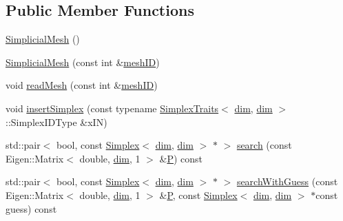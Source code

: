 \subsection*{Public Member Functions}
\begin{DoxyCompactItemize}
\item 
\hyperlink{classmodel_1_1_simplicial_mesh_af84ab44ecf01c06410af0e7f3197f55d}{Simplicial\+Mesh} ()
\item 
\hyperlink{classmodel_1_1_simplicial_mesh_ad6e3f7fa2244f9225ab9c1f3e2dbeea8}{Simplicial\+Mesh} (const int \&\hyperlink{_f_e_m_2linear__elasticity__3d_2tetgen_2generate_p_o_l_ycube_8m_a08458a039e09e0161694c4dc402b9732}{mesh\+I\+D})
\item 
void \hyperlink{classmodel_1_1_simplicial_mesh_a3aa461ba7e48b0f6f2712b7d3080468d}{read\+Mesh} (const int \&\hyperlink{_f_e_m_2linear__elasticity__3d_2tetgen_2generate_p_o_l_ycube_8m_a08458a039e09e0161694c4dc402b9732}{mesh\+I\+D})
\item 
void \hyperlink{classmodel_1_1_simplicial_mesh_a009ee6831738dcd9deacb996c4c68c96}{insert\+Simplex} (const typename \hyperlink{structmodel_1_1_simplex_traits}{Simplex\+Traits}$<$ \hyperlink{classmodel_1_1_simplicial_mesh_ad468b9bb3c67ec696a104445990d356ea29115db50a11d5e61cc38bf2db030e66}{dim}, \hyperlink{classmodel_1_1_simplicial_mesh_ad468b9bb3c67ec696a104445990d356ea29115db50a11d5e61cc38bf2db030e66}{dim} $>$\+::Simplex\+I\+D\+Type \&x\+I\+N)
\item 
std\+::pair$<$ bool, const \hyperlink{classmodel_1_1_simplex}{Simplex}$<$ \hyperlink{classmodel_1_1_simplicial_mesh_ad468b9bb3c67ec696a104445990d356ea29115db50a11d5e61cc38bf2db030e66}{dim}, \hyperlink{classmodel_1_1_simplicial_mesh_ad468b9bb3c67ec696a104445990d356ea29115db50a11d5e61cc38bf2db030e66}{dim} $>$ $\ast$ $>$ \hyperlink{classmodel_1_1_simplicial_mesh_a86c678632fb205d1da7960c2cb5bc1e5}{search} (const Eigen\+::\+Matrix$<$ double, \hyperlink{classmodel_1_1_simplicial_mesh_ad468b9bb3c67ec696a104445990d356ea29115db50a11d5e61cc38bf2db030e66}{dim}, 1 $>$ \&\hyperlink{_f_e_m_2linear__elasticity__3d_2tetgen_2generate_p_o_l_ycube_8m_a50a9afb44201a65ab7ad5feb2150aeb6}{P}) const 
\item 
std\+::pair$<$ bool, const \hyperlink{classmodel_1_1_simplex}{Simplex}$<$ \hyperlink{classmodel_1_1_simplicial_mesh_ad468b9bb3c67ec696a104445990d356ea29115db50a11d5e61cc38bf2db030e66}{dim}, \hyperlink{classmodel_1_1_simplicial_mesh_ad468b9bb3c67ec696a104445990d356ea29115db50a11d5e61cc38bf2db030e66}{dim} $>$ $\ast$ $>$ \hyperlink{classmodel_1_1_simplicial_mesh_ad4d516ca3f17572bd9f3fc44bcddaac6}{search\+With\+Guess} (const Eigen\+::\+Matrix$<$ double, \hyperlink{classmodel_1_1_simplicial_mesh_ad468b9bb3c67ec696a104445990d356ea29115db50a11d5e61cc38bf2db030e66}{dim}, 1 $>$ \&\hyperlink{_f_e_m_2linear__elasticity__3d_2tetgen_2generate_p_o_l_ycube_8m_a50a9afb44201a65ab7ad5feb2150aeb6}{P}, const \hyperlink{classmodel_1_1_simplex}{Simplex}$<$ \hyperlink{classmodel_1_1_simplicial_mesh_ad468b9bb3c67ec696a104445990d356ea29115db50a11d5e61cc38bf2db030e66}{dim}, \hyperlink{classmodel_1_1_simplicial_mesh_ad468b9bb3c67ec696a104445990d356ea29115db50a11d5e61cc38bf2db030e66}{dim} $>$ $\ast$const guess) const 

\end{DoxyCompactItemize}
